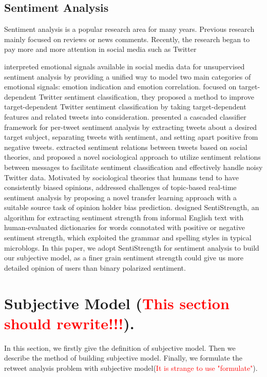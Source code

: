 \documentclass{acm_proc_article-sp}
\newcommand{\mo}[1]{\textcolor{red}{#1}}
\begin{document}
\subsection{Sentiment Analysis}
Sentiment analysis is a popular research area for many years. Previous research mainly focused on reviews or news comments. 
Recently, the research began to pay more and more attention in social media such as Twitter
 
\cite{Hu:2013www} interpreted emotional signals available in social media data for unsupervised sentiment analysis by providing a unified way to model two main categories of emotional signals: emotion indication and emotion correlation. 
\cite{Jiang:2011TTS} focused on target-dependent Twitter sentiment classification, they proposed a method to improve target-dependent Twitter sentiment classification by taking target-dependent features and related tweets into consideration. 
\cite{AsiaeeT:2012} presented a cascaded classifier framework for per-tweet sentiment analysis by extracting tweets about a desired target subject, separating tweets with sentiment, and setting apart positive from negative tweets.
\cite{Hu:2013ESR} extracted sentiment relations between tweets based on social theories, and proposed a novel sociological approach to utilize sentiment relations between messages to facilitate sentiment classification and effectively handle noisy Twitter data.
Motivated by sociological theories that humans tend to have consistently biased opinions, \cite{CalaisGuerra:2011BOT} addressed challenges of topic-based real-time sentiment analysis by proposing a novel transfer learning approach with a suitable source task of opinion holder bias prediction.
\cite{Thelwall:2010SSS,Thelwall:2012SSD} designed SentiStrength, an algorithm for extracting sentiment strength from informal English text with human-evaluated dictionaries for words connotated with positive or negative sentiment strength, which exploited the grammar and spelling styles in typical microblogs.
In this paper, we adopt SentiStrength for sentiment analysis to build our subjective model, as a finer grain sentiment strength could give us more detailed opinion of users than binary polarized sentiment.

\section{Subjective Model (\mo{This section should rewrite!!!}).}
\label{subjectivemodel}
In this section, we firstly give the definition of subjective model. Then we describe the method of building subjective model. Finally, we formulate the retweet analysis problem with subjective model(\mo{It is strange to use "formulate"}).
\end{document}
